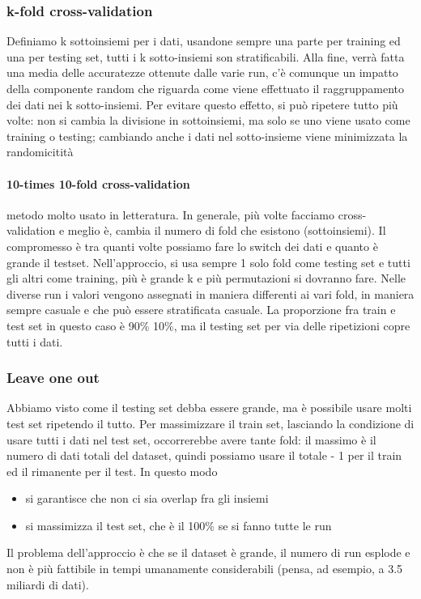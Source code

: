 \documentclass{article}
\begin{document}
\subsubsection{k-fold cross-validation}
Definiamo k sottoinsiemi per i dati, usandone sempre una parte per training ed una per testing set, tutti i k sotto-insiemi son stratificabili. Alla fine, verrà fatta una media delle accuratezze ottenute dalle varie run, c'è comunque un impatto della componente random che riguarda come viene effettuato il raggruppamento dei dati nei k sotto-insiemi. Per evitare questo effetto, si può ripetere tutto più volte: non si cambia la divisione in sottoinsiemi, ma solo se uno viene usato come training o testing; cambiando anche i dati nel sotto-insieme viene minimizzata la randomicitità
\paragraph{10-times 10-fold cross-validation} metodo molto usato in letteratura. In generale, più volte facciamo cross-validation e meglio è, cambia il numero di fold che esistono (sottoinsiemi). Il compromesso è tra quanti volte possiamo fare lo switch dei dati e quanto è grande il testset. Nell'approccio, si usa sempre 1 solo fold come testing set e tutti gli altri come training, più è grande k e più permutazioni si dovranno fare. Nelle diverse run i valori vengono assegnati in maniera differenti ai vari fold, in maniera sempre casuale e che può essere stratificata casuale. La proporzione fra train e test set in questo caso è 90\% 10\%, ma il testing set per via delle ripetizioni copre tutti i dati.
\subsubsection{Leave one out}
Abbiamo visto come il testing set debba essere grande, ma è possibile usare molti test set ripetendo il tutto. Per massimizzare il train set, lasciando la condizione di usare tutti i dati nel test set, occorrerebbe avere tante fold: il massimo è il numero di dati totali del dataset, quindi possiamo usare il totale - 1 per il train ed il rimanente per il test. In questo modo 
\begin{itemize}
\item si garantisce che non ci sia overlap fra gli insiemi
\item si massimizza il test set, che è il 100\% se si fanno tutte le run
\end{itemize}
Il problema dell'approccio è che se il dataset è grande, il numero di run esplode e non è più fattibile in tempi umanamente considerabili (pensa, ad esempio, a 3.5 miliardi di dati).
\end{document}
